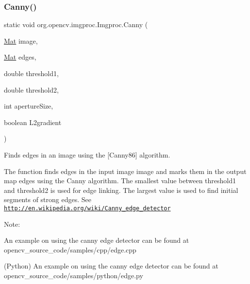\subsubsection{\texorpdfstring{Canny()}{Canny()}\hspace{0.1cm}{\footnotesize\ttfamily [1/2]}}
{\footnotesize\ttfamily static void org.\+opencv.\+imgproc.\+Imgproc.\+Canny (\begin{DoxyParamCaption}\item[{\mbox{\hyperlink{classorg_1_1opencv_1_1core_1_1_mat}{Mat}}}]{image,  }\item[{\mbox{\hyperlink{classorg_1_1opencv_1_1core_1_1_mat}{Mat}}}]{edges,  }\item[{double}]{threshold1,  }\item[{double}]{threshold2,  }\item[{int}]{aperture\+Size,  }\item[{boolean}]{L2gradient }\end{DoxyParamCaption})\hspace{0.3cm}{\ttfamily [static]}}

Finds edges in an image using the \mbox{[}Canny86\mbox{]} algorithm.

The function finds edges in the input image {\ttfamily image} and marks them in the output map {\ttfamily edges} using the Canny algorithm. The smallest value between {\ttfamily threshold1} and {\ttfamily threshold2} is used for edge linking. The largest value is used to find initial segments of strong edges. See \href{http://en.wikipedia.org/wiki/Canny_edge_detector}{\tt http\+://en.\+wikipedia.\+org/wiki/\+Canny\+\_\+edge\+\_\+detector}

Note\+:


\begin{DoxyItemize}
\item An example on using the canny edge detector can be found at opencv\+\_\+source\+\_\+code/samples/cpp/edge.\+cpp 
\item (Python) An example on using the canny edge detector can be found at opencv\+\_\+source\+\_\+code/samples/python/edge.\+py 
\end{DoxyItemize}


